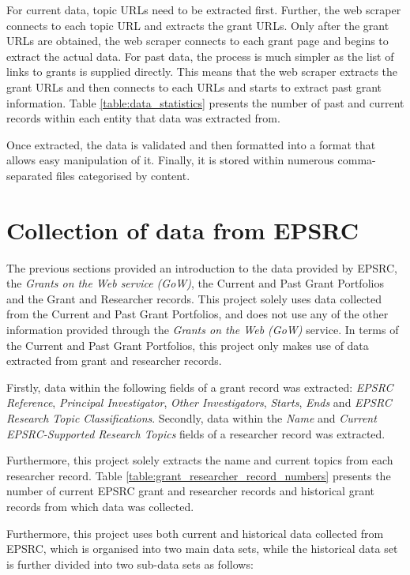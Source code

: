 For current data, topic URLs need to be extracted first. Further, the web scraper connects to each topic URL and extracts the grant URLs. Only after the grant URLs are obtained, the web scraper connects to each grant page and begins to extract the actual data. For past data, the process is much simpler as the list of links to grants is supplied directly. This means that the web scraper extracts the grant URLs and then connects to each URLs and starts to extract past grant information. Table \ref{table:data_statistics} presents the number of past and current records within each entity that data was extracted from.

Once extracted, the data is validated and then formatted into a format that allows easy manipulation of it. Finally, it is stored within numerous comma-separated files categorised by content.
\fi

\section{Collection of data from EPSRC}

The previous sections provided an introduction to the data provided by EPSRC, the \textit{Grants on the Web service (GoW)}, the Current and Past Grant Portfolios and the Grant and Researcher records. This project solely uses data collected from the Current and Past Grant Portfolios, and does not use any of the other information provided through the \textit{Grants on the Web (GoW)} service. In terms of the Current and Past Grant Portfolios, this project only makes use of data extracted from grant and researcher records. 

Firstly, data within the following fields of a grant record was extracted:
\textit{EPSRC Reference}, \textit{Principal Investigator}, \textit{Other Investigators}, \textit{Starts}, \textit{Ends} and \textit{EPSRC Research Topic Classifications}. Secondly, data within the \textit{Name} and \textit{Current EPSRC-Supported Research Topics} fields of a researcher record was extracted. 

Furthermore, this project solely extracts the name and current topics from each researcher record. Table \ref{table:grant_researcher_record_numbers} presents the number of current EPSRC grant and researcher records and historical grant records from which data was collected.

Furthermore, this project uses both current and historical data collected from EPSRC, which is organised into two main data sets, while the historical data set is further divided into two sub-data sets as follows:

